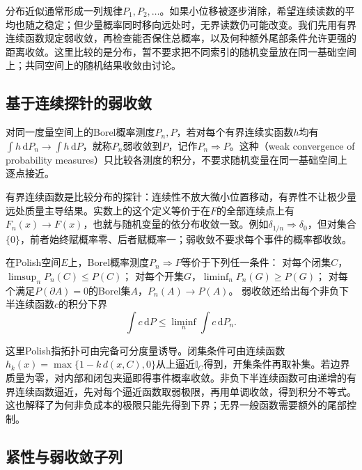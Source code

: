 分布近似通常形成一列规律\(P_1,P_2,\ldots\)。如果小位移被逐步消除，希望连续读数的平均也随之稳定；但少量概率同时移向远处时，无界读数仍可能改变。我们先用有界连续函数规定弱收敛，再检查能否保住总概率，以及何种额外尾部条件允许更强的距离收敛。这里比较的是分布，暂不要求把不同索引的随机变量放在同一基础空间上；共同空间上的随机结果收敛由讨论。

\subsection{基于连续探针的弱收敛}
\label{sec:information-continuous-probe-convergence}
\begin{definition}[概率测度的弱收敛]
\label{def:information-weak-measure-convergence}
对同一度量空间上的Borel概率测度\(P_n,P\)，若对每个有界连续实函数\(h\)均有
\(\int h\,\mathrm dP_n\to\int h\,\mathrm dP\)，就称\(P_n\)弱收敛到\(P\)，记作\(P_n\Rightarrow P\)。这种（weak convergence of probability measures）只比较各测度的积分，不要求随机变量在同一基础空间上逐点接近。
\end{definition}
有界连续函数是比较分布的探针：连续性不放大微小位置移动，有界性不让极少量远处质量主导结果。实数上的这个定义等价于在\(F\)的全部连续点上有\(F_n(x)\to F(x)\)，也就与随机变量的依分布收敛一致。例如\(\delta_{1/n}\Rightarrow\delta_0\)，但对集合\(\{0\}\)，前者始终赋概率零、后者赋概率一；弱收敛不要求每个事件的概率都收敛。

\begin{theorem}[Portmanteau的常用形式]
\label{thm:rv-portmanteau}
在Polish空间\(E\)上，Borel概率测度\(P_n\Rightarrow P\)等价于下列任一条件：
对每个闭集\(C\)，\(\limsup_nP_n(C)\leq P(C)\)；
对每个开集\(G\)，\(\liminf_nP_n(G)\geq P(G)\)；
对每个满足\(P(\partial A)=0\)的Borel集\(A\)，\(P_n(A)\to P(A)\)。
弱收敛还给出每个非负下半连续函数\(c\)的积分下界
\[
\int c\,\mathrm dP\leq\liminf_n\int c\,\mathrm dP_n.
\]
\end{theorem}
这里Polish指拓扑可由完备可分度量诱导。闭集条件可由连续函数
\(h_k(x)=\max\{1-k\,d(x,C),0\}\)从上逼近\(\mathbb I_C\)得到，开集条件再取补集。若边界质量为零，对内部和闭包夹逼即得事件概率收敛。非负下半连续函数可由递增的有界连续函数逼近，先对每个逼近函数取弱极限，再用单调收敛，得到积分不等式。这也解释了为何非负成本的极限只能先得到下界；无界一般函数需要额外的尾部控制。

\subsection{紧性与弱收敛子列}
\label{sec:rv-weak-convergence}

